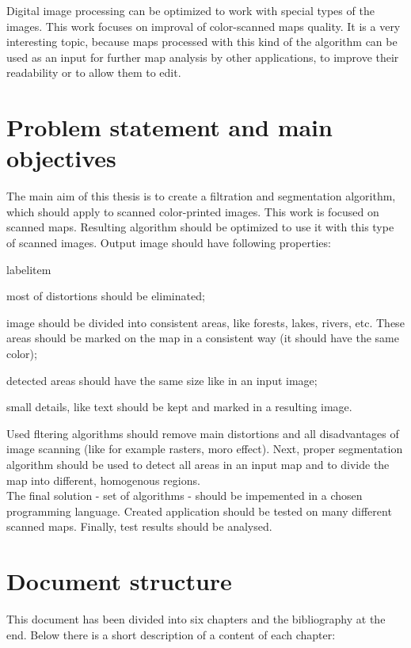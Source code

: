 \documentclass[a4paper,onecolumn,oneside,12pt]{memoir}
\makeatletter
\renewenvironment{itemize}{
  \begin{list}{  
  \csname labelitem\romannumeral\the\@listdepth\endcsname}{
  \setlength{\leftmargin}{1em}
	\setlength{\topsep}{6pt}%
	\setlength{\partopsep}{0pt}%
	\setlength{\parskip}{0pt}%
	\setlength{\parsep}{0pt}%
	\setlength{\itemsep}{0pt}}
}{
  \end{list}
}
\makeatother
\begin{document}
Digital image processing can be optimized to work with special types of the images. This work 
focuses on improval of color-scanned maps quality. It is a very interesting topic, because maps
processed with this kind of the algorithm can be used as an input for further map analysis by other 
applications, to improve their readability or to allow them to edit.

\section{Problem statement and main objectives}

The main aim of this thesis is to create a filtration and segmentation algorithm, which should apply
to scanned color-printed images. This work is focused on scanned maps. Resulting algorithm should be
optimized to use it with this type of scanned images. Output image should have following properties:

\begin{itemize}
  \item most of distortions should be eliminated;
  \item image should be divided into consistent areas, like forests, lakes, rivers, etc. These areas
        should be marked on the map in a consistent way (it should have the same color);
  \item detected areas should have the same size like in an input image;
  \item small details, like text should be kept and marked in a resulting image.
\end{itemize}

Used fltering algorithms should remove main distortions and all disadvantages of image scanning (like
for example rasters, moro effect). Next, proper segmentation algorithm should be used to detect all
areas in an input map and to divide the map into different, homogenous regions. \\

The final solution - set of algorithms - should be impemented in a chosen programming language.
Created application should be tested on many different scanned maps. Finally, test results should be
analysed.

\section{Document structure}

This document has been divided into six chapters and the bibliography at the end.
Below there is a short description of a content of each chapter:
\end{document}
